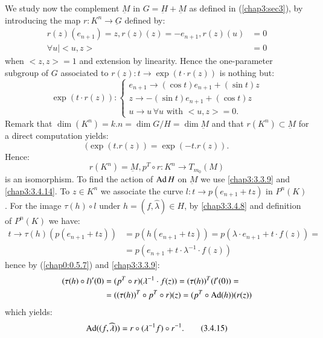 We study now the complement $\underbar{M}$ in
$G=\underbar{H}+\underbar{M}$ as defined in (\ref{chap3:sec3}), by
introducing the map $r:K^{n}\to \underbar{G}$ defined by:
\begin{align*}
r(z)(e_{n+1})=z, r(z)(z)=-e_{n+1},r(z)(u) &=
0\tag{3.4.12}\label{chap3:3.4.12}\\
 \forall u|<u,z> &= 0
\end{align*}
when $<z,z>=1$ and extension by linearity. Hence the one-parameter
subgroup of $G$ associated to $r(z):t\to \exp(t\cdot r(z))$ is nothing
but:
\begin{equation*}
\exp(t\cdot r(z)):
\begin{cases}
e_{n+1}\to (\cos t)e_{n+1}+(\sin t)z\\
z\to -(\sin t)e_{n+1}+(\cos t)z\\
u\to u \, \forall u\text{ \ with \ } <u,z>=0.
\end{cases}\tag{3.4.13}\label{chap3:3.4.13}
\end{equation*}
Remark that $\dim(K^{n})=k.n=\dim G/H=\dim\underbar{M}$ and that
$r(K^{n})\subset \underbar{M}$ for a direct computation yields:
$$
(\exp(t.r(z))=\exp(-t.r(z)).
$$\pageoriginale
Hence:
\begin{equation*}
r(K^{n})=\underbar{M},p^{T}\circ r:K^{n}\to
T_{m_{0}}(M)\tag{3.4.14}\label{chap3:3.4.14} 
\end{equation*}
is an isomorphism. To find the action of $\operatorname{Ad} H$ on $\underbar{M}$ we
use \eqref{chap3:3.3.9} and \eqref{chap3:3.4.14}. To $z\in K^{n}$ we associate the
curve $l:t\to p(e_{n+1}+tz)$ in $P^{n}(K)$. For the image
$\tau(h)\circ l$ under $h=(f,\widehat{\lambda})\in H$, by
\eqref{chap3:3.4.8} and definition of $P^{n}(K)$ we have: 
\begin{align*}
t\to\tau (h)(p(e_{n+1}+tz)) &= p(h(e_{n+1}+tz))=p(\lambda\cdot
e_{n+1}+t\cdot f(z))=\\
&= p(e_{n+1}+t\cdot\lambda^{-1}\cdot f(z))
\end{align*}
hence by (\ref{chap0:0.5.7}) and \eqref{chap3:3.3.9}:
\begin{align*}
(\tau(h)\circ l)'(0) &= (p^{T}\circ r)(\lambda^{-1}\cdot
  f(z))=(\tau(h))^{T}(l'(0))=\\ 
&= ((\tau(h))^{T}\circ p^{T}\circ r)(z)=(p^{T}\circ \operatorname{Ad}(h))(r(z))
\end{align*}
which yields:
\begin{equation*}
\operatorname{Ad}((f,\widehat{\lambda}))=r\circ (\lambda^{-1}f)\circ
r^{-1}.\tag{3.4.15}\label{chap3:3.4.15} 
\end{equation*}

